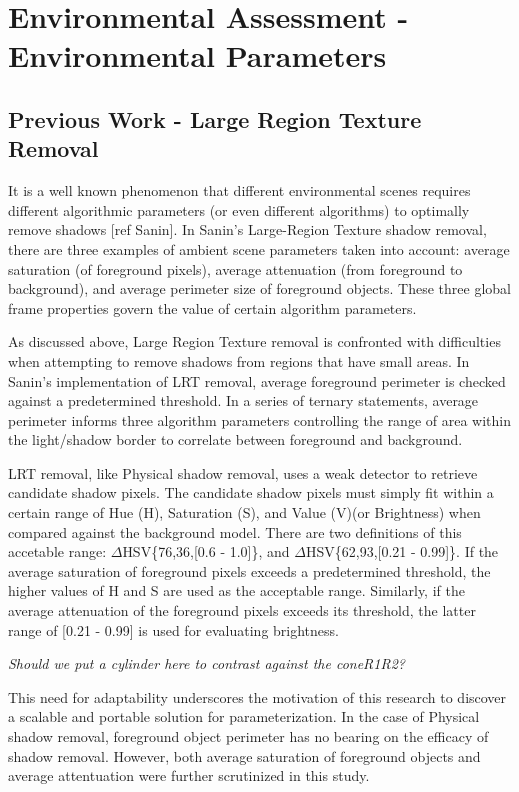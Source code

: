 \documentclass[12pt]{report}
\begin{document}
\section{Environmental Assessment - Environmental Parameters}

\subsection{Previous Work - Large Region Texture Removal}

It is a well known phenomenon that different environmental scenes requires different algorithmic parameters (or even different algorithms) to optimally remove shadows [ref Sanin]. In Sanin's Large-Region Texture shadow removal, there are three examples of ambient scene parameters taken into account: average saturation (of foreground pixels), average attenuation (from foreground to background), and average perimeter size of foreground objects. These three global frame properties govern the value of certain algorithm parameters.

As discussed above, Large Region Texture removal is confronted with difficulties when attempting to remove shadows from regions that have small areas. In Sanin's implementation of LRT removal, average foreground perimeter is checked against a predetermined threshold. In a series of ternary statements, average perimeter informs three algorithm parameters controlling the range of area within the light/shadow border to correlate between foreground and background.

LRT removal, like Physical shadow removal, uses a weak detector to retrieve candidate shadow pixels. The candidate shadow pixels must simply fit within a certain range of Hue (H), Saturation (S), and Value (V)(or Brightness) when compared against the background model. There are two definitions of this accetable range: $\Delta$HSV\{76,36,[0.6 - 1.0]\}, and $\Delta$HSV\{62,93,[0.21 - 0.99]\}. If the average saturation of foreground pixels exceeds a predetermined threshold, the higher values of H and S are used as the acceptable range. Similarly, if the average attenuation of the foreground pixels exceeds its threshold, the latter range of [0.21 - 0.99] is used for evaluating brightness. 

\textit{Should we put a cylinder here to contrast against the coneR1R2?}

This need for adaptability underscores the motivation of this research to discover a scalable and portable solution for parameterization. In the case of Physical shadow removal, foreground object perimeter has no bearing on the efficacy of shadow removal. However, both average saturation of foreground objects and average attentuation were further scrutinized in this study.
\end{document}
